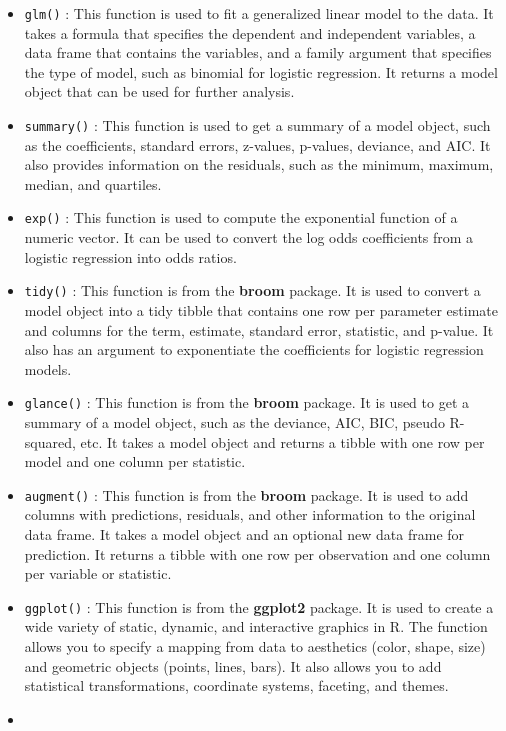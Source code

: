 \documentclass[
]{book}
\providecommand{\tightlist}{%
  \setlength{\itemsep}{0pt}\setlength{\parskip}{0pt}}
\begin{document}
\begin{itemize}
\tightlist
\item
  \texttt{glm()} : This function is used to fit a generalized linear model to the data. It takes a formula that specifies the dependent and independent variables, a data frame that contains the variables, and a family argument that specifies the type of model, such as binomial for logistic regression. It returns a model object that can be used for further analysis.
\item
  \texttt{summary()} : This function is used to get a summary of a model object, such as the coefficients, standard errors, z-values, p-values, deviance, and AIC. It also provides information on the residuals, such as the minimum, maximum, median, and quartiles.
\item
  \texttt{exp()} : This function is used to compute the exponential function of a numeric vector. It can be used to convert the log odds coefficients from a logistic regression into odds ratios.
\item
  \texttt{tidy()} : This function is from the \textbf{broom} package. It is used to convert a model object into a tidy tibble that contains one row per parameter estimate and columns for the term, estimate, standard error, statistic, and p-value. It also has an argument to exponentiate the coefficients for logistic regression models.
\item
  \texttt{glance()} : This function is from the \textbf{broom} package. It is used to get a summary of a model object, such as the deviance, AIC, BIC, pseudo R-squared, etc. It takes a model object and returns a tibble with one row per model and one column per statistic.
\item
  \texttt{augment()} : This function is from the \textbf{broom} package. It is used to add columns with predictions, residuals, and other information to the original data frame. It takes a model object and an optional new data frame for prediction. It returns a tibble with one row per observation and one column per variable or statistic.
\item
  \texttt{ggplot()} : This function is from the \textbf{ggplot2} package. It is used to create a wide variety of static, dynamic, and interactive graphics in R. The function allows you to specify a mapping from data to aesthetics (color, shape, size) and geometric objects (points, lines, bars). It also allows you to add statistical transformations, coordinate systems, faceting, and themes.
\item

\end{itemize}
\end{document}
